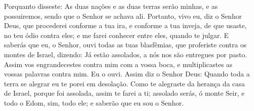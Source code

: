 Porquanto disseste: As duas nações e as duas terras serão minhas,
e as possuiremos, sendo que o Senhor se achava ali. Portanto,
vivo eu, diz o Senhor Deus, que procederei conforme a tua ira, e
conforme a tua inveja, de que usaste, no teu ódio contra eles; e me
farei conhecer entre eles, quando te julgar. E saberás que
eu, o Senhor, ouvi todas as tuas blasfêmias, que proferiste contra
os montes de Israel, dizendo: Já estão assolados, a nós nos são
entregues por pasto. Assim vos engrandecestes contra mim com
a vossa boca, e multiplicastes as vossas palavras contra mim. Eu o
ouvi. Assim diz o Senhor Deus: Quando toda a terra se alegrar
eu te porei em desolação. Como te alegraste da herança da
casa de Israel, porque foi assolada, assim te farei a ti; assolado
serás, ó monte Seir, e todo o Edom, sim, todo ele; e saberão que eu
sou o Senhor.

\medskip

